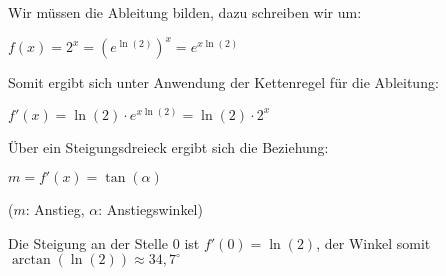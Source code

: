 \item Wir müssen die Ableitung bilden, dazu schreiben wir um:

$ f(x) = 2^x = ({e^{\ln(2)}})^x=e^{x\ln(2)}$

Somit ergibt sich unter Anwendung der Kettenregel für die Ableitung:

$f'(x) = \ln(2) \cdot e^{x\ln(2)} = \ln(2) \cdot 2^x $

Über ein Steigungsdreieck ergibt sich die Beziehung:

$ m = f'(x) = \tan(\alpha)$

($m$: Anstieg, $\alpha$: Anstiegswinkel)

Die Steigung an der Stelle 0 ist $f'(0) = \ln(2)$, der Winkel somit $\arctan (\ln(2)) \approx 34,7^{\circ}$

